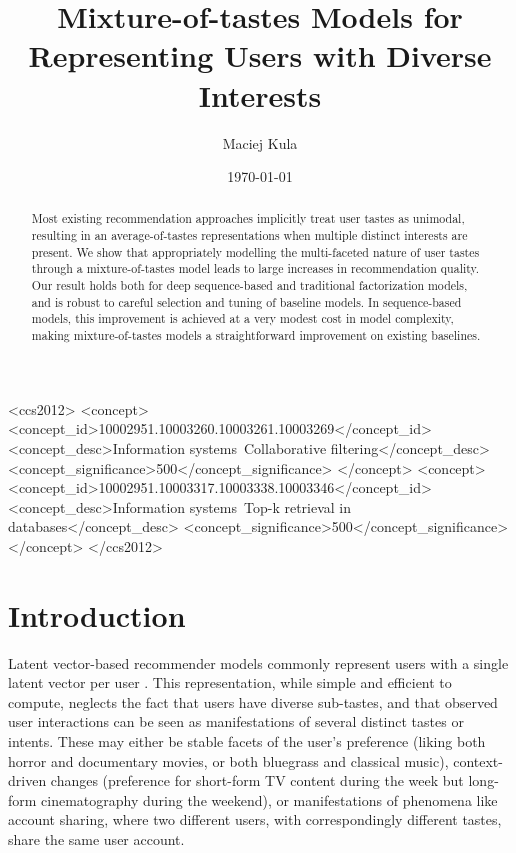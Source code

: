 \documentclass[sigconf]{acmart}
\begin{document}


\title{Mixture-of-tastes Models for Representing Users with Diverse Interests}
\author{Maciej Kula}
\date{\today}
\acmConference[]{}{}{}

\begin{CCSXML}
<ccs2012>
<concept>
<concept_id>10002951.10003260.10003261.10003269</concept_id>
<concept_desc>Information systems~Collaborative filtering</concept_desc>
<concept_significance>500</concept_significance>
</concept>
<concept>
<concept_id>10002951.10003317.10003338.10003346</concept_id>
<concept_desc>Information systems~Top-k retrieval in databases</concept_desc>
<concept_significance>500</concept_significance>
</concept>
</ccs2012>
\end{CCSXML}



\begin{abstract}
Most existing recommendation approaches implicitly treat user tastes as unimodal, resulting in an average-of-tastes representations when multiple distinct interests are present. We show that appropriately modelling the multi-faceted nature of user tastes through a mixture-of-tastes model leads to large increases in recommendation quality. Our result holds both for deep sequence-based and traditional factorization models, and is robust to careful selection and tuning of baseline models. In sequence-based models, this improvement is achieved at a very modest cost in model complexity, making mixture-of-tastes models a straightforward improvement on existing baselines.
\end{abstract}

\maketitle

\section{Introduction}
Latent vector-based recommender models commonly represent users with a single latent vector per user \citep{koren2009bellkor, hu2008collaborative}. This representation, while simple and efficient to compute, neglects the fact that users have diverse sub-tastes, and that observed user interactions can be seen as manifestations of several distinct tastes or intents. These may either be stable facets of the user's preference (liking both horror and documentary movies, or both bluegrass and classical music), context-driven changes (preference for short-form TV content during the week but long-form cinematography during the weekend), or manifestations of phenomena like account sharing, where two different users, with correspondingly different tastes, share the same user account.
\end{document}
